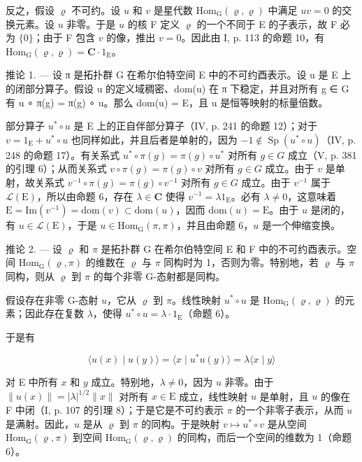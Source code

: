 反之，假设 \(\varrho\) 不可约。设 \(u\) 和 \(v\) 是星代数 \(\mathrm{Hom}_{\mathrm{G}}(\varrho, \varrho)\) 中满足 \(uv = 0\) 的交换元素。设 \(u\) 非零。于是 \(u\) 的核 F 定义 \(\varrho\) 的一个不同于 E 的子表示，故 F 必为 \(\{0\}\)；由于 F 包含 \(v\) 的像，推出 \(v = 0\)。因此由 I, p. 113 的命题 10，有 \(\mathrm{Hom}_{\mathrm{G}}(\varrho, \varrho) = \mathbf{C} \cdot 1_{\mathrm{E}}\)。

推论 1. --- 设 π 是拓扑群 G 在希尔伯特空间 E 中的不可约酉表示。设 u 是 E 上的闭部分算子。假设 u 的定义域稠密、dom(u) 在 π 下稳定，并且对所有 g ∈ G 有 u ∘ π(g) = π(g) ∘ u。那么 dom(u) = E，且 u 是恒等映射的标量倍数。

部分算子 \(u^{*} \circ u\) 是 E 上的正自伴部分算子（IV, p. 241 的命题 12）；对于 \(v = 1_{\mathrm{E}} + u^{*} \circ u\) 也同样如此，并且后者是单射的，因为 \(-1 \notin \operatorname{Sp}(u^{*} \circ u)\)（IV, p. 248 的命题 17）。有关系式 \(u^{*} \circ \pi(g) = \pi(g) \circ u^{*}\) 对所有 \(g \in G\) 成立（V, p. 381 的引理 6）；从而关系式 \(v \circ \pi(g) = \pi(g) \circ v\) 对所有 \(g \in G\) 成立。由于 \(v\) 是单射，故关系式 \(v^{-1} \circ \pi(g) = \pi(g) \circ v^{-1}\) 对所有 \(g \in G\) 成立。由于 \(v^{-1}\) 属于 \(\mathcal{L}(\mathrm{E})\)，所以由命题 6，存在 \(\lambda \in \mathbf{C}\) 使得 \(v^{-1} = \lambda 1_{\mathrm{E}}\)。必有 \(\lambda \neq 0\)，这意味着 \(\mathrm{E} = \mathrm{Im}(v^{-1}) = \mathrm{dom}(v) \subset \mathrm{dom}(u)\)，因而 \(\mathrm{dom}(u) = \mathrm{E}\)。由于 \(u\) 是闭的，有 \(u \in \mathcal{L}(\mathrm{E})\)，于是 \(u \in \mathrm{Hom}_{\mathrm{G}}(\pi, \pi)\)，并且由命题 6，\(u\) 是一个伸缩变换。

推论 2. --- 设 \(\varrho\) 和 \(\pi\) 是拓扑群 G 在希尔伯特空间 E 和 F 中的不可约酉表示。空间 \(\mathrm{Hom}_{\mathrm{G}}(\varrho, \pi)\) 的维数在 \(\varrho\) 与 \(\pi\) 同构时为 1，否则为零。特别地，若 \(\varrho\) 与 \(\pi\) 同构，则从 \(\varrho\) 到 \(\pi\) 的每个非零 G-态射都是同构。

假设存在非零 G-态射 \(u\)，它从 \(\varrho\) 到 \(\pi\)。线性映射 \(u^{*} \circ u\) 是 \(\mathrm{Hom}_{\mathrm{G}}(\varrho, \varrho)\) 的元素；因此存在复数 \(\lambda\)，使得 \(u^{*} \circ u = \lambda \cdot 1_{\mathrm{E}}\)（命题 6）。

于是有

\[
\langle u (x) \mid u (y) \rangle = \langle x \mid u ^ {*} u (y) \rangle = \lambda \langle x \mid y \rangle
\]

对 E 中所有 \(x\) 和 \(y\) 成立。特别地，\(\lambda \neq 0\)，因为 \(u\) 非零。由于 \(\| u(x)\| = |\lambda |^{1 / 2}\| x\|\) 对所有 \(x\in \mathrm{E}\) 成立，线性映射 \(u\) 是单射，且 \(u\) 的像在 F 中闭（I, p. 107 的引理 8）；于是它是不可约表示 \(\pi\) 的一个非零子表示，从而 \(u\) 是满射。因此，\(u\) 是从 \(\varrho\) 到 \(\pi\) 的同构。于是映射 \(v\mapsto u^{*}\circ v\) 是从空间 \(\mathrm{Hom}_{\mathrm{G}}(\varrho ,\pi)\) 到空间 \(\mathrm{Hom}_{\mathrm{G}}(\varrho ,\varrho)\) 的同构，而后一个空间的维数为 1（命题 6）。

